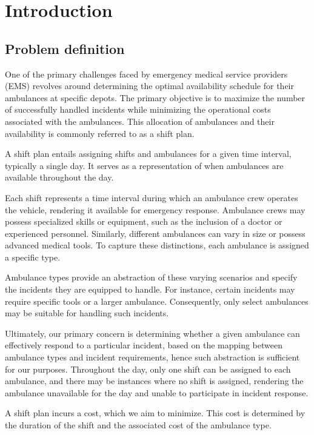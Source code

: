 \setlength{\parindent}{0pt}

\chapter{Introduction}

\section{Problem definition}
One of the primary challenges faced by emergency medical service providers
(EMS) revolves around determining the optimal availability schedule for their
ambulances at specific depots. The primary objective is to maximize the number
of successfully handled incidents while minimizing the operational costs
associated with the ambulances. This allocation of ambulances and their
availability is commonly referred to as a shift plan.

A shift plan entails assigning shifts and ambulances for a given time interval,
typically a single day. It serves as a representation of when ambulances are
available throughout the day.

Each shift represents a time interval during which an ambulance crew operates
the vehicle, rendering it available for emergency response. Ambulance crews may
possess specialized skills or equipment, such as the inclusion of a doctor or
experienced personnel. Similarly, different ambulances can vary in size or
possess advanced medical tools. To capture these distinctions, each ambulance
is assigned a specific type.

Ambulance types provide an abstraction of these varying scenarios and specify
the incidents they are equipped to handle. For instance, certain incidents may
require specific tools or a larger ambulance. Consequently, only select
ambulances may be suitable for handling such incidents.

Ultimately, our primary concern is determining whether a given ambulance can
effectively respond to a particular incident, based on the mapping between
ambulance types and incident requirements, hence such abstraction is sufficient
for our purposes. Throughout the day, only one shift can be assigned to each
ambulance, and there may be instances where no shift is assigned, rendering the
ambulance unavailable for the day and unable to participate in incident
response.

A shift plan incurs a cost, which we aim to minimize. This cost is determined
by the duration of the shift and the associated cost of the ambulance type.

